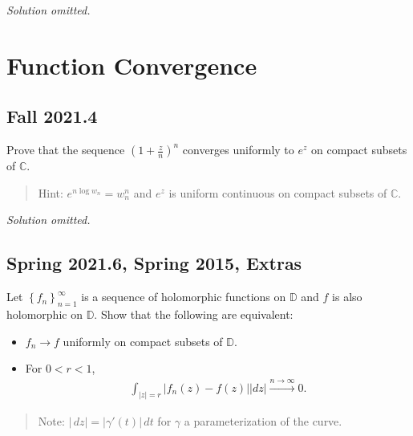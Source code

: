 \emph{Solution omitted.}

\hypertarget{function-convergence}{%
\section{Function Convergence}\label{function-convergence}}

\hypertarget{fall-2021.4}{%
\subsection{Fall 2021.4}\label{fall-2021.4}}

\begin{problem}[?]

Prove that the sequence \(\left(1+\frac{z}{n}\right)^{n}\) converges
uniformly to \(e^{z}\) on compact subsets of \(\mathbb{C}\).

\begin{quote}
Hint: \(e^{n \log w_{n}}=w_{n}^{n}\) and \(e^{z}\) is uniform continuous
on compact subsets of \(\mathbb{C}\).
\end{quote}

\end{problem}

\emph{Solution omitted.}

\hypertarget{spring-2021.6-spring-2015-extras}{%
\subsection{Spring 2021.6, Spring 2015,
Extras}\label{spring-2021.6-spring-2015-extras}}

\begin{problem}[?]

Let \(\left\{{f_n}\right\}_{n=1}^\infty\) is a sequence of holomorphic
functions on \({\mathbb{D}}\) and \(f\) is also holomorphic on
\({\mathbb{D}}\). Show that the following are equivalent:

\begin{itemize}
\tightlist
\item
  \(f_n\to f\) uniformly on compact subsets of \({\mathbb{D}}\).
\item
  For \(0 < r < 1\),
  \begin{align*}
  \int_{{\left\lvert {z} \right\rvert} = r} {\left\lvert {f_n(z) - f(z)} \right\rvert} {\left\lvert {dz} \right\rvert} \overset{n\to\infty}\longrightarrow 0
  .\end{align*}
\end{itemize}

\begin{quote}
Note:
\({\left\lvert {\,dz} \right\rvert} = {\left\lvert {\gamma'(t)} \right\rvert}\,dt\)
for \(\gamma\) a parameterization of the curve.
\end{quote}

\end{problem}

